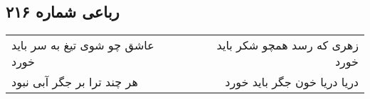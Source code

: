 \begin{center}
\section*{رباعی شماره ۲۱۶}
\label{sec:sh216}
\begin{longtable}{l p{0.5cm} r}
عاشق چو شوی تیغ به سر باید خورد
&&
زهری که رسد همچو شکر باید خورد
\\
هر چند ترا بر جگر آبی نبود
&&
دریا دریا خون جگر باید خورد
\\
\end{longtable}
\end{center}
